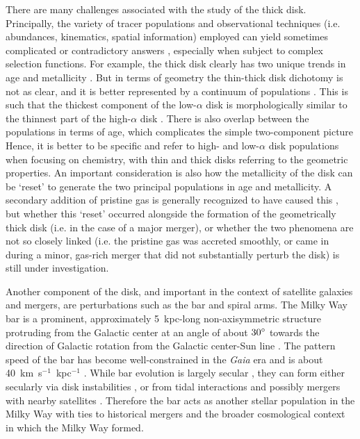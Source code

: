 There are many challenges associated with the study of the thick disk. Principally, the variety of tracer populations and observational techniques (i.e. abundances, kinematics, spatial information) employed can yield sometimes complicated or contradictory answers \parencite{minchev15,kawata16}, especially when subject to complex selection functions. For example, the thick disk clearly has two unique trends in age and metallicity \parencite{haywood13,hayden15}. But in terms of geometry the thin-thick disk dichotomy is not as clear, and it is better represented by a continuum of populations \parencite{bovy12e,bovy16b}. This is such that the thickest component of the low-$\alpha$ disk is morphologically similar to the thinnest part of the high-$\alpha$ disk \parencite{hayden17}. There is also overlap between the populations in terms of age, which complicates the simple two-component picture \parencite{mackereth17,hayden17} Hence, it is better to be specific and refer to high- and low-$\alpha$ disk populations when focusing on chemistry, with thin and thick disks referring to the geometric properties. An important consideration is also how the metallicity of the disk can be `reset' to generate the two principal populations in age and metallicity. A secondary addition of pristine gas is generally recognized to have caused this \parencite[see][]{chiappini97}, but whether this `reset' occurred alongside the formation of the geometrically thick disk (i.e. in the case of a major merger), or whether the two phenomena are not so closely linked (i.e. the pristine gas was accreted smoothly, or came in during a minor, gas-rich merger that did not substantially perturb the disk) is still under investigation.

Another component of the disk, and important in the context of satellite galaxies and mergers, are perturbations such as the bar and spiral arms. The Milky Way bar is a prominent, approximately 5~kpc-long non-axisymmetric structure protruding from the Galactic center at an angle of about $30\hbox{$^\circ$}$ towards the direction of Galactic rotation from the Galactic center-Sun line \parencite{wegg15}. The pattern speed of the bar has become well-constrained in the \textit{Gaia} era and is about 40~km~s$^{-1}$~kpc$^{-1}$ \parencite[e.g.][]{bovy19,sanders19}. While bar evolution is largely secular \parencite{athanassoula03}, they can form either secularly via disk instabilities \parencite{ostriker73}, or from tidal interactions and possibly mergers with nearby satellites \parencite{noguchi87,gerin90}. Therefore the bar acts as another stellar population in the Milky Way with ties to historical mergers and the broader cosmological context in which the Milky Way formed.


